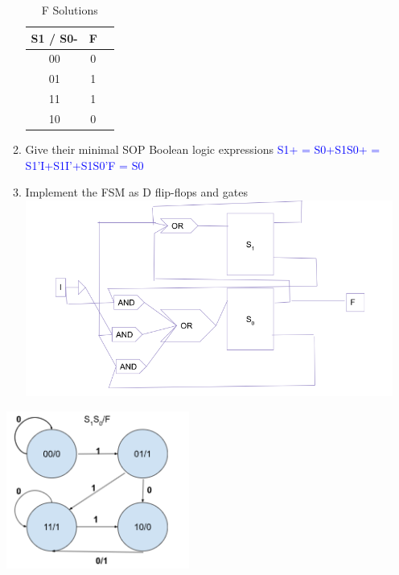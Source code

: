 \documentclass{article}
\begin{document}
\begin{enumerate}[label=(\alph*)]
\begin{enumerate}[label=(\roman*),nolistsep]
\begin{table}[h]
\centering
\begin{tabular}{|c|c|c|}
\hline
S1 / S0- & F \\
\hline
00 & 0 \\
01 & 1 \\
11 & 1 \\
10 & 0 \\
\hline
\end{tabular}
\caption{F Solutions }
\end{table}
            \item Give their minimal SOP Boolean logic expressions \newline\textcolor{blue}{S1+ = S0+S1\newline S0+ = S1’I+S1I’+S1S0’\newline F = S0}
            \item Implement the FSM as D flip-flops and gates
            \newline 
            \includegraphics{figures/ScuffedDiagram.PNG}
        \end{enumerate}
        \begin{multicols}{2}
        \begin{center}
        \includegraphics[width=6cm]{figures/FSMDesign.png}
        \end{center}
        \columnbreak

\end{multicols}
\end{enumerate}
\end{document}
